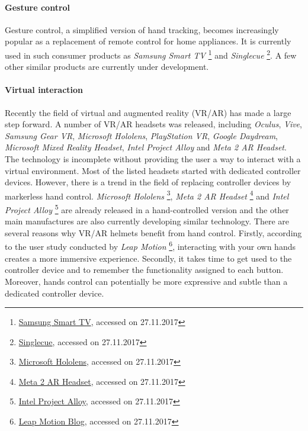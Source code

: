 \paragraph{Gesture control} Gesture control, a simplified version of hand tracking, becomes increasingly popular as a replacement of remote control for home appliances. It is currently used in such consumer products as 
%
\textit{Samsung Smart TV}
\footnote{\href{http://www.samsung.com/ph/smarttv/motion_control.html}{Samsung Smart TV}, accessed on 27.11.2017}
%
 and \textit{Singlecue}
 \footnote{\href{https://singlecue.com/}{Singlecue}, accessed on 27.11.2017}.
%
 A few other similar products are currently under development.

\paragraph{Virtual interaction} Recently the field of virtual and augmented reality (VR/AR) has made a large step forward. A number of VR/AR headsets was released, including 
\textit{Oculus}, \textit{Vive}, \textit{Samsung Gear VR}, \textit{Microsoft Hololens}, \textit{PlayStation VR}, \textit{Google Daydream}, \textit{Microsoft Mixed Reality Headset}, \textit{Intel Project Alloy} and \textit{Meta 2 AR Headset}. The technology is incomplete without providing the user a way to interact with a virtual environment. Most of the listed headsets started with dedicated controller devices. However, there is a trend in the field of replacing controller devices by markerless hand control.
%
\textit{Microsoft Hololens}
\footnote{\href{https://www.microsoft.com/en-us/hololens}{Microsoft Hololens}, accessed on 27.11.2017},
%
\textit{Meta 2 AR Headset}
\footnote{\href{https://www.metavision.com/}{Meta 2 AR Headset}, accessed on 27.11.2017} and
%
\textit{Intel Project Alloy} 
\footnote{\href{https://newsroom.intel.com/press-kits/project-alloy/}{Intel Project Alloy}, accessed on 27.11.2017}
%
are already released in a hand-controlled version and the other main manufactures are also currently developing similar technology.
There are several reasons why VR/AR helmets benefit from hand control. Firstly, according to the user study conducted by 
%
\textit{Leap Motion}
\footnote{\href{http://blog.leapmotion.com/image-hands-bring-your-own-hands-into-virtual-reality/}{Leap Motion Blog}, accessed on 27.11.2017},
%
interacting with your own hands creates a more immersive experience. Secondly, it takes time to get used to the controller device and to remember the functionality assigned to each button. Moreover, hands control can potentially be more expressive and subtle than a dedicated controller device.

